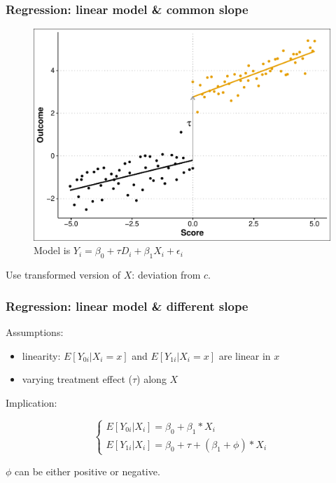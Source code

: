 \documentclass[12pt,english,dvipsnames,aspectratio=169,handout]{beamer}\usepackage[]{graphicx}\usepackage[]{xcolor}
\begin{document}
\begin{frame}
\frametitle{Regression: linear model \& common slope}



\begin{figure}
\centering
\includegraphics[scale=0.4]{../04-figures/07/09.pdf}
\caption{Model is $Y_i = \beta_0 + \tau D_i + \beta_1X_i + \epsilon_i$}
\end{figure}

Use transformed version of $X$: deviation from $c$.
\end{frame}


\begin{frame}
\frametitle{Regression: linear model \& different slope}
Assumptions:

\begin{itemize}
\item linearity: $E[Y_{0i} | X_i = x]$ and $E[Y_{1i} | X_i = x]$ are linear in $x$
\item varying treatment effect ($\tau$) along $X$
\end{itemize}\bigskip
\pause

Implication:

\begin{equation}
\begin{cases}
E[Y_{0i} | X_i] = \beta_0 + \beta_1*X_i \\
E[Y_{1i} | X_i] = \beta_0 + \tau + (\beta_1 + \phi)*X_i
\end{cases}
\end{equation}

$\phi$ can be either positive or negative.

\end{frame}
\end{document}
